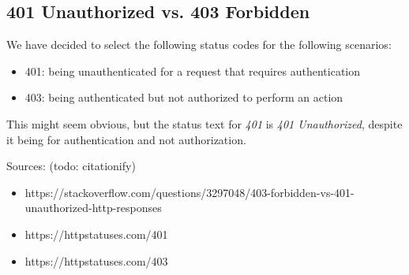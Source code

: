 \documentclass[bsc,frontabs,twoside,singlespacing,parskip,deptreport]{infthesis}     %
\begin{document}
\subsection{401 Unauthorized vs. 403 Forbidden}

We have decided to select the following status codes for the following scenarios:

\begin{itemize}
  \item 401: being unauthenticated for a request that requires authentication
  \item 403: being authenticated but not authorized to perform an action
\end{itemize}

This might seem obvious, but the status text for \emph{401} is \emph{401 Unauthorized},
despite it being for authentication and not authorization.

Sources: (todo: citationify)
\begin{itemize}
  \item https://stackoverflow.com/questions/3297048/403-forbidden-vs-401-unauthorized-http-responses
  \item https://httpstatuses.com/401
  \item https://httpstatuses.com/403
\end{itemize}





\end{document}
